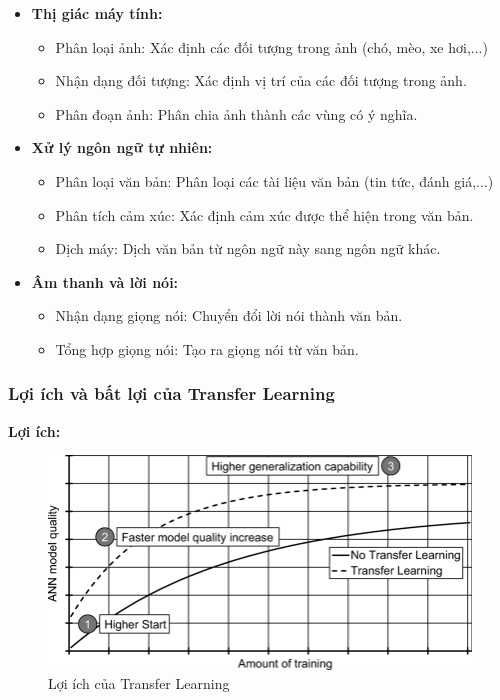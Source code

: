\begin{itemize}
    \item \textbf{Thị giác máy tính:} 
        \begin{itemize}
            \item Phân loại ảnh: Xác định các đối tượng trong ảnh (chó, mèo, xe hơi,...)
            \item Nhận dạng đối tượng: Xác định vị trí của các đối tượng trong ảnh.
            \item Phân đoạn ảnh: Phân chia ảnh thành các vùng có ý nghĩa.
        \end{itemize}
    \item \textbf{Xử lý ngôn ngữ tự nhiên:}
        \begin{itemize}
            \item Phân loại văn bản: Phân loại các tài liệu văn bản (tin tức, đánh giá,...)
            \item Phân tích cảm xúc: Xác định cảm xúc được thể hiện trong văn bản.
            \item Dịch máy: Dịch văn bản từ ngôn ngữ này sang ngôn ngữ khác.
        \end{itemize}
    \item \textbf{Âm thanh và lời nói:}
        \begin{itemize}
            \item Nhận dạng giọng nói: Chuyển đổi lời nói thành văn bản.
            \item Tổng hợp giọng nói: Tạo ra giọng nói từ văn bản.
        \end{itemize}
\end{itemize}

\subsubsection{Lợi ích và bất lợi của Transfer Learning}

\textbf{Lợi ích:}

 \begin{figure}[H]
    \centering
    \includegraphics[scale = 0.4]{Images/Theoretical basis/Possible-advantages-of-transfer-learning.png}
\caption{Lợi ích của Transfer Learning}
\end{figure}


